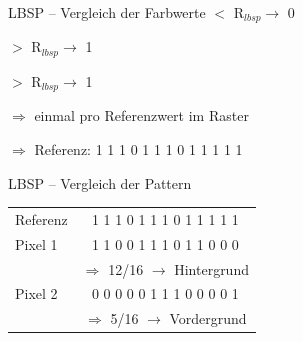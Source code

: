 \documentclass[hyperref={pdfpagelabels=false}]{beamer}
\begin{document}
\begin{frame}[t]{LBSP -- Vergleich der Farbwerte}
	\centering
	\bigskip
	\bigskip
	 $<$ R$_{lbsp} \rightarrow$ 0

	 $>$ R$_{lbsp} \rightarrow$ 1
	
	 $>$ R$_{lbsp} \rightarrow$ 1

	\bigskip
	\bigskip
	$\Rightarrow$ einmal pro Referenzwert im Raster
	\bigskip
	
	$\Rightarrow$ Referenz: 1 1 1 0 1 1 1 0 1 1 1 1 1

\end{frame}


\begin{frame}[t]{LBSP -- Vergleich der Pattern}
	\centering
	\begin{table}
		\centering
		\label{tab:label}
		\renewcommand{\arraystretch}{2}
		\begin{tabular}{lc}
			Referenz& 	1 1 1 0\quad 1 1 1 1\quad 0 0 1 1\quad 1 1 1 1\\
			Pixel 1& 	1 1 0 0\quad 1 1 1 1\quad 0 0 1 1\quad 1 0 0 0\\
			& 		$\Rightarrow$ 12/16 $\rightarrow$ Hintergrund\\
			Pixel 2& 	0 0 0 0\quad 1 0 1 1\quad 0 1 0 0\quad 0 0 0 1\\
			& 		$\Rightarrow$ 5/16 $\rightarrow$ Vordergrund\\
		\end{tabular}
	\end{table}
\end{frame}
\end{document}
